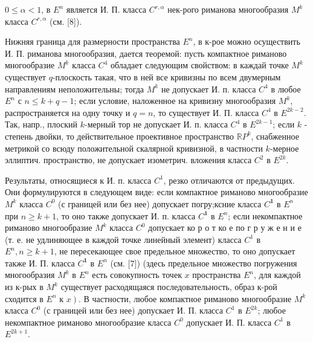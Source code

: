 \documentclass[10pt]{article}
\begin{document}
$0 \leqslant \alpha<1$, в $E^{n}$ является И. П. класса $C^{r, \alpha}$ нек-рого риманова многообразия $M^{k}$ класса $C^{r, \alpha}$ (см. [8]).



Нижняя граница для размерности пространства $E^{n}$, в к-рое можно осуществить И. П. риманова многообразия, дается теоремой: пусть компактное риманово многообразие $M^{k}$ класса $C^{4}$ обладает следующим свойством: в каждай точке $M^{k}$ существует $q$-плоскость такая, что в ней все кривизны по всем двумерным направлениям неположительны; тогда $M^{k}$ не допускает И. п. класса $C^{4}$ в любое $E^{n}$ с $n \leqslant k+q-1$; если условие, наложенное на кривизну многообразия $M^{k}$, распространяется на одну точку и $q=n$, то существует И. П. класса $C^{4}$ в $E^{2 k-2}$. Так, напр., плоский $k$-мерный тор не допускает И. п. класса $C^{4}$ в $E^{2 k-1}$; если $k$ - степень двойки, то действительное проективное пространство $\mathbb{R} P^{k}$, снабженное метрикой со всюду положительной скалярной кривизной, в частности $k$-мерное эллиптич. пространство, не допускает изометрич. вложения класса $C^{2}$ в $E^{2 k}$.



Результаты, относящиеся к И. п. класса $C^{1}$, резко отличаются от предыдущих. Они формулируются в следующем виде: если компактное риманово многообразие $M^{k}$ класса $C^{0}$ (с границей или без нее) допускает погру;ксние класса $C^{\mathbf{1}}$ в $E^{n}$ при $n \geqslant k+1$, то оно также допускает И. п. класса $C^{\mathbf{1}}$ в $E^{n}$; если некомпактное риманово многообразие $M^{k}$ класса $C^{0}$ допускает ко р о т ко е по г р у ж е н и е (т. е. не удлиняющее в каждой точке линейный элемент) класса $C^{1}$ в $E^{n}, n \geqslant k+1$, не пересекающее свое предельное множество, то оно допускает также И. П. класса $C^{\mathbf{1}}$ в $E^{n}$ (см. [7]) (здесь предельное множество погружения многообразия $M^{k}$ в $E^{n}$ есть совокупность точек $x$ пространства $E^{n}$, для каждой из к-рых в $M^{k}$ существует расходящаяся последовательность, образ к-рой сходится в $E^{n}$ к $\left.x\right)$. В частности, любое компактное риманово многообразие $M^{k}$ класса $C^{0}$ (с границей или без нее) допускает И. П. класса $C^{1}$ в $E^{2 k}$; любое некомпактное риманово многообразие класса $C^{0}$ допускает И. П. класса $C^{1}$ в $E^{2 k+1}$.
\end{document}

